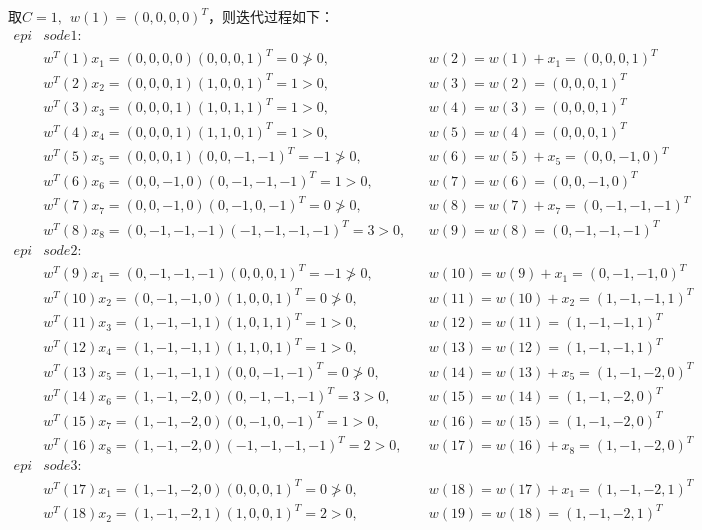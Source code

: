 \documentclass[a4paper, UTF8, 12pt]{ctexart}
\begin{document}
    取$C=1,\ \  w(1) = (0,0,0,0)^T$，则迭代过程如下：
        \begin{align*}
            epi&sode1: \\
            &w^T(1)x_1 = (0,0,0,0)(0,0,0,1)^T=0 \not> 0, &&w(2)=w(1)+x_1=(0,0,0,1)^T \\
            &w^T(2)x_2 = (0,0,0,1)(1,0,0,1)^T=1 > 0, &&w(3)=w(2)=(0,0,0,1)^T \\
            &w^T(3)x_3 = (0,0,0,1)(1,0,1,1)^T=1 > 0, &&w(4)=w(3)=(0,0,0,1)^T \\
            &w^T(4)x_4 = (0,0,0,1)(1,1,0,1)^T=1 > 0, &&w(5)=w(4)=(0,0,0,1)^T \\ 
            &w^T(5)x_5 = (0,0,0,1)(0,0,-1,-1)^T=-1 \not> 0, &&w(6)=w(5)+x_5=(0,0,-1,0)^T \\
            &w^T(6)x_6 = (0,0,-1,0)(0,-1,-1,-1)^T=1 > 0, &&w(7)=w(6)=(0,0,-1,0)^T \\
            &w^T(7)x_7 = (0,0,-1,0)(0,-1,0,-1)^T=0 \not> 0, &&w(8)=w(7)+x_7=(0,-1,-1,-1)^T \\
            &w^T(8)x_8 = (0,-1,-1,-1)(-1,-1,-1,-1)^T=3 > 0, &&w(9)=w(8)=(0,-1,-1,-1)^T \\
            epi&sode2: \\
            &w^T(9)x_1 = (0,-1,-1,-1)(0,0,0,1)^T=-1 \not> 0, &&w(10)=w(9)+x_1=(0,-1,-1,0)^T \\
            &w^T(10)x_2 = (0,-1,-1,0)(1,0,0,1)^T=0 \not> 0, &&w(11)=w(10)+x_2=(1,-1,-1,1)^T \\
            &w^T(11)x_3 = (1,-1,-1,1)(1,0,1,1)^T=1 > 0, &&w(12)=w(11)=(1,-1,-1,1)^T \\
            &w^T(12)x_4 = (1,-1,-1,1)(1,1,0,1)^T=1 > 0, &&w(13)=w(12)=(1,-1,-1,1)^T \\ 
            &w^T(13)x_5 = (1,-1,-1,1)(0,0,-1,-1)^T=0 \not> 0, &&w(14)=w(13)+x_5=(1,-1,-2,0)^T \\
            &w^T(14)x_6 = (1,-1,-2,0)(0,-1,-1,-1)^T=3 > 0, &&w(15)=w(14)=(1,-1,-2,0)^T \\
            &w^T(15)x_7 = (1,-1,-2,0)(0,-1,0,-1)^T=1 > 0, &&w(16)=w(15)=(1,-1,-2,0)^T \\
            &w^T(16)x_8 = (1,-1,-2,0)(-1,-1,-1,-1)^T=2 > 0, &&w(17)=w(16)+x_8=(1,-1,-2,0)^T \\
            epi&sode3: \\
            &w^T(17)x_1 = (1,-1,-2,0)(0,0,0,1)^T=0 \not> 0, &&w(18)=w(17)+x_1=(1,-1,-2,1)^T \\
            &w^T(18)x_2 = (1,-1,-2,1)(1,0,0,1)^T=2 > 0, &&w(19)=w(18)=(1,-1,-2,1)^T \\

\end{align*}
\end{document}
